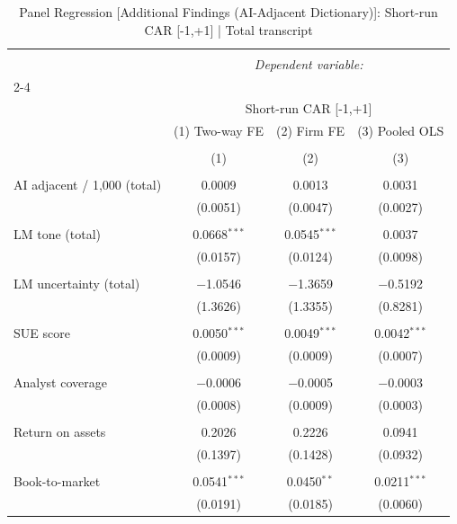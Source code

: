 
\begin{table}[!htbp] \centering 
  \caption{Panel Regression [Additional Findings (AI-Adjacent Dictionary)]: Short-run CAR [-1,+1]  |  Total transcript} 
  \label{} 
\begin{tabular}{@{\extracolsep{5pt}}lccc} 
\\[-1.8ex]\hline 
\hline \\[-1.8ex] 
 & \multicolumn{3}{c}{\textit{Dependent variable:}} \\ 
\cline{2-4} 
\\[-1.8ex] & \multicolumn{3}{c}{Short-run CAR [-1,+1]} \\ 
 & (1) Two-way FE & (2) Firm FE & (3) Pooled OLS \\ 
\\[-1.8ex] & (1) & (2) & (3)\\ 
\hline \\[-1.8ex] 
 AI adjacent / 1,000 (total) & 0.0009 & 0.0013 & 0.0031 \\ 
  & (0.0051) & (0.0047) & (0.0027) \\ 
  & & & \\ 
 LM tone (total) & 0.0668$^{***}$ & 0.0545$^{***}$ & 0.0037 \\ 
  & (0.0157) & (0.0124) & (0.0098) \\ 
  & & & \\ 
 LM uncertainty (total) & $-$1.0546 & $-$1.3659 & $-$0.5192 \\ 
  & (1.3626) & (1.3355) & (0.8281) \\ 
  & & & \\ 
 SUE score & 0.0050$^{***}$ & 0.0049$^{***}$ & 0.0042$^{***}$ \\ 
  & (0.0009) & (0.0009) & (0.0007) \\ 
  & & & \\ 
 Analyst coverage & $-$0.0006 & $-$0.0005 & $-$0.0003 \\ 
  & (0.0008) & (0.0009) & (0.0003) \\ 
  & & & \\ 
 Return on assets & 0.2026 & 0.2226 & 0.0941 \\ 
  & (0.1397) & (0.1428) & (0.0932) \\ 
  & & & \\ 
 Book-to-market & 0.0541$^{***}$ & 0.0450$^{**}$ & 0.0211$^{***}$ \\ 
  & (0.0191) & (0.0185) & (0.0060) \\ 

\end{tabular}
\end{table}
